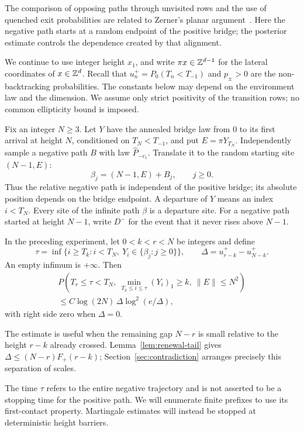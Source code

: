 The comparison of opposing paths through unvisited rows and the use of
quenched exit probabilities are related to Zerner's planar
argument~\cite[Section~2]{Zerner2007}. Here the negative path starts at
a random endpoint of the positive bridge; the posterior estimate controls
the dependence created by that alignment.

We continue to use integer height $x_1$, and write $\pi x\in\mathbb Z^{d-1}$
for the lateral coordinates of $x\in\mathbb Z^d$.  Recall that
$u_n^+=P_0(T_n<T_{-1})$ and $p_\pm>0$ are the non-backtracking
probabilities.  The constants below may depend on the environment law and
the dimension.  We assume only strict positivity of the transition rows;
no common ellipticity bound is imposed.

Fix an integer $N\ge3$.  Let $Y$ have the annealed bridge law from $0$ to its first
arrival at height $N$, conditioned on $T_N<T_{-1}$, and put
$E=\pi Y_{T_N}$.  Independently sample a negative path $B$ with law
$\widehat P_{-e_1}$.  Translate it to the random starting site $(N-1,E)$:
\[
 \beta_j=(N-1,E)+B_j,\qquad j\ge0.
\]
Thus the relative negative path is independent of the positive bridge;
its absolute position depends on the bridge endpoint.  A departure of
$Y$ means an index $i<T_N$.  Every site of the infinite path $\beta$ is
a departure site.  For a negative path started at height $N-1$, write
$D^-$ for the event that it never rises above $N-1$.

\begin{proposition}
\label{prop:contact-bound}
In the preceding experiment, let $0<k<r<N$ be integers and define
\[
 \tau=\inf\{i\ge T_k:i<T_N,\ Y_i\in\{\beta_j:j\ge0\}\},
 \qquad
 \Delta=u^+_{r-k}-u^+_{N-k}.
\]
An empty infimum is $+\infty$.  Then
\begin{multline}\label{eq:first-contact-bound}
 P\left(T_r\le\tau<T_N,\
       \min_{T_k\le i\le\tau}(Y_i)_1\ge k,\
       \|E\|\le N^2\right)\\
 \le C\log(2N)\,\Delta\log^2(e/\Delta),
\end{multline}
with right side zero when $\Delta=0$.
\end{proposition}

The estimate is useful when the remaining gap $N-r$ is small relative
to the height $r-k$ already crossed. Lemma~\ref{lem:renewal-tail} gives
$\Delta\le (N-r)F_+(r-k)$; Section~\ref{sec:contradiction} arranges
precisely this separation of scales.

The time $\tau$ refers to the entire negative trajectory and is not
asserted to be a stopping time for the positive path.  We will enumerate
finite prefixes to use its first-contact property.  Martingale estimates
will instead be stopped at deterministic height barriers.


